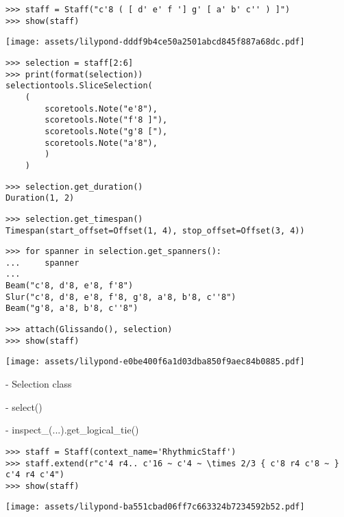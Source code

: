\begin{abjadbookoutput}
\begin{singlespacing}
\vspace{-0.5\baselineskip}
\begin{lstlisting}
>>> staff = Staff("c'8 ( [ d' e' f '] g' [ a' b' c'' ) ]")
>>> show(staff)
\end{lstlisting}
\noindent\texttt{[image: assets/lilypond-dddf9b4ce50a2501abcd845f887a68dc.pdf]}
\begin{lstlisting}
>>> selection = staff[2:6]
>>> print(format(selection))
selectiontools.SliceSelection(
    (
        scoretools.Note("e'8"),
        scoretools.Note("f'8 ]"),
        scoretools.Note("g'8 ["),
        scoretools.Note("a'8"),
        )
    )
\end{lstlisting}
\begin{lstlisting}
>>> selection.get_duration()
Duration(1, 2)
\end{lstlisting}
\begin{lstlisting}
>>> selection.get_timespan()
Timespan(start_offset=Offset(1, 4), stop_offset=Offset(3, 4))
\end{lstlisting}
\begin{lstlisting}
>>> for spanner in selection.get_spanners():
...     spanner
...
Beam("c'8, d'8, e'8, f'8")
Slur("c'8, d'8, e'8, f'8, g'8, a'8, b'8, c''8")
Beam("g'8, a'8, b'8, c''8")
\end{lstlisting}
\begin{lstlisting}
>>> attach(Glissando(), selection)
>>> show(staff)
\end{lstlisting}
\noindent\texttt{[image: assets/lilypond-e0be400f6a1d03dba850f9aec84b0885.pdf]}
\end{singlespacing}
\end{abjadbookoutput}

-   Selection class

-   select()

-   inspect\_(...).get\_logical\_tie()

\begin{comment}
<abjad>
staff = Staff(context_name='RhythmicStaff')
staff.extend(r"c'4 r4.. c'16 ~ c'4 ~ \times 2/3 { c'8 r4 c'8 ~ } c'4 r4 c'4")
show(staff)
</abjad>
\end{comment}

\begin{abjadbookoutput}
\begin{singlespacing}
\vspace{-0.5\baselineskip}
\begin{lstlisting}
>>> staff = Staff(context_name='RhythmicStaff')
>>> staff.extend(r"c'4 r4.. c'16 ~ c'4 ~ \times 2/3 { c'8 r4 c'8 ~ } c'4 r4 c'4")
>>> show(staff)
\end{lstlisting}
\noindent\texttt{[image: assets/lilypond-ba551cbad06ff7c663324b7234592b52.pdf]}
\end{singlespacing}
\end{abjadbookoutput}

